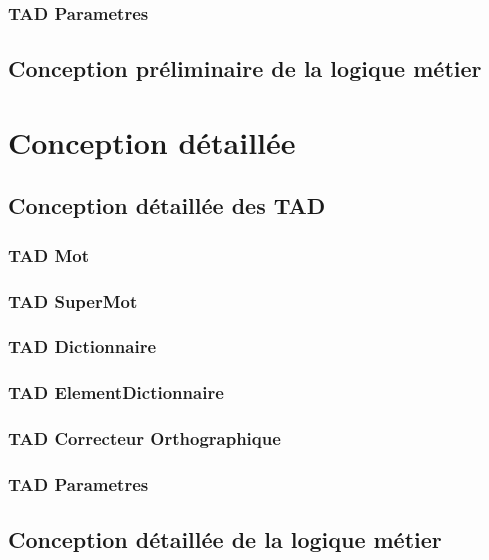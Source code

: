 \documentclass[12pt,titlepage,a4paper]{report}
\newcommand{\inputCP}[1]{}
\newcommand{\inputCD}[1]{}
\begin{document}
	\section{TAD Parametres}										\inputCP{TADParametres}
	
\chapter{Conception préliminaire de la logique métier}			\inputCP{logiqueMetier}	


\part{Conception détaillée}
\chapter{Conception détaillée des TAD}
\minitoc
	\section{TAD Mot}												\inputCD{TADMot}
	\section{TAD SuperMot}											\inputCD{TADSuperMot}
	\section{TAD Dictionnaire}										\inputCD{TADDictionnaire}
	\section{TAD ElementDictionnaire}								\inputCD{TADElementDictionnaire}
	\section{TAD Correcteur Orthographique}							\inputCD{TADCorrecteurOrthographique}
	\section{TAD Parametres}										\inputCD{TADParametres}

\chapter{Conception détaillée de la logique métier}				\inputCD{logiqueMetier}
\end{document}
